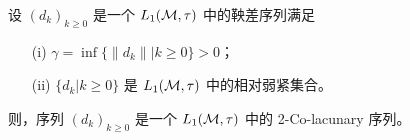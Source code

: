 \begin{theorem}
\cite*{parcet2006gundy}
设 $(d_k)_{k\geq0}$ 是一个 $L_1(\mathcal{M},\tau)$ 中的鞅差序列满足
\begin{itemize}
  \item[(i)] $\gamma=\inf\{\|d_k\| | k\geq 0\}>0$；
  \item[(ii)] $\{d_k|k\geq0\}$ 是 $L_1(\mathcal{M},\tau)$ 中的相对弱紧集合。
\end{itemize}
则，序列 $(d_k)_{k\geq0}$ 是一个 $L_1(\mathcal{M},\tau)$ 中的 2-Co-lacunary 序列。
\end{theorem}
